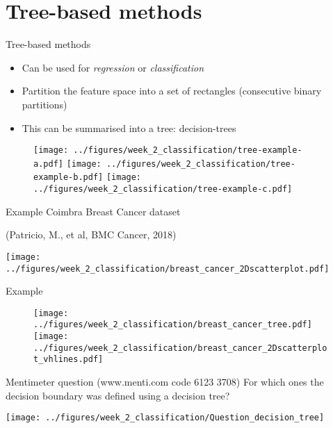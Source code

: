 \documentclass[notes]{beamer}          %
\begin{document}
\section{Tree-based methods}
\begin{frame}{Tree-based methods}
\begin{itemize}
 \item Can be used for \textit{regression} or \textit{classification}
 \item Partition the feature space into a set of rectangles (consecutive binary partitions)
 \item This can be summarised into a tree: decision-trees
 \end{itemize}
 
 \begin{figure}
  \texttt{[image: ../figures/week\_2\_classification/tree-example-a.pdf]}  
\endminipage\hfill
{}
  \texttt{[image: ../figures/week\_2\_classification/tree-example-b.pdf]}  
\endminipage\hfill
{}%
  \texttt{[image: ../figures/week\_2\_classification/tree-example-c.pdf]}  
\endminipage
\end{figure}

\end{frame}



\begin{frame}{Example}
Coimbra Breast Cancer dataset

(Patricio, M., et al, BMC Cancer, 2018)
\vspace{-1cm}
\begin{center}
\texttt{[image: ../figures/week\_2\_classification/breast\_cancer\_2Dscatterplot.pdf]}  
\end{center}
\end{frame}

\begin{frame}{Example}
 \begin{figure}
  \texttt{[image: ../figures/week\_2\_classification/breast\_cancer\_tree.pdf]}  
\endminipage\hfill
{}%
  \texttt{[image: ../figures/week\_2\_classification/breast\_cancer\_2Dscatterplot\_vhlines.pdf]}  
\endminipage
\end{figure}
\end{frame}

\begin{frame}{Mentimeter question (www.menti.com code 6123 3708)}
For which ones the decision boundary was defined using a decision tree?
\begin{center}
\texttt{[image: ../figures/week\_2\_classification/Question\_decision\_tree]}  
\end{center}
\end{frame}
\end{document}
